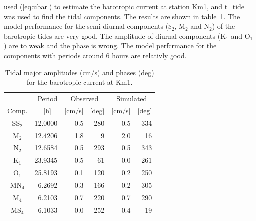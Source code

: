\cite{hjelm:etal:2017} used (\ref{eq:ubar}) to estimate the barotropic current at station Km1, and t\_tide was used to find the tidal components. The results are shown in table~\ref{tab:UbarTide}. The model performance for the semi diurnal components (S$_2$, M$_2$ and N$_2$) of the barotropic tides are very good. The amplitude of diurnal components (K$_1$ and O$_1$) are to weak and the phase is wrong. The model performance for the components with periods around 6 hours are relativly good.
  
\begin{table}[ht]
	\caption{\small Tidal major amplitudes (cm/s) and phases (deg) for the barotropic current at Km1.}
	\label{tab:UbarTide}
	\centering
	\begin{tabular}{crrrrr} \hline
       		& \small Period     & \multicolumn{2}{c}{\small Observed}	& \multicolumn{2}{c}{\small Simulated}  \\
\small Comp.	& \small [h] $\;\;$ & \small [cm/s] 	& \small [deg]	& \small [cm/s] 	& \small [deg]   \\ \hline 
\small SS$_2$  & 12.0000    &  0.5 	& 280	&   0.5 & 334   \\
M$_2$  & 12.4206    &  1.8 	&   9	&   2.0 &  16   \\
N$_2$  & 12.6584    &  0.5 	& 293	&   0.5 & 343   \\
K$_1$  & 23.9345    &  0.5 	&  61	&   0.0 & 261   \\
O$_1$  & 25.8193    &  0.1 	& 120	&   0.2 & 250   \\
MN$_4$ &  6.2692    &  0.3 	& 166	&   0.2 & 305   \\
M$_4$  &  6.2103    &  0.7 	& 220	&   0.7 & 290   \\
MS$_4$ &  6.1033    &  0.0 	& 252	&   0.4 &  19   \\ \hline 
\end{tabular}
\end{table}
  
